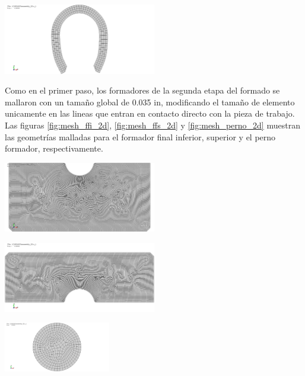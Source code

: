 \begin{center}
\includegraphics[width=0.5\textwidth]{src/ch3/mesh_deformed_blank_2d.png}
\label{fig:mesh_deformed_blank_2d}
\end{center}

Como en el primer paso, los formadores de la segunda etapa del formado se mallaron con un tamaño global de 0.035 in, 
modificando el tamaño de elemento unicamente en las lineas que entran en contacto directo con la pieza de trabajo.
Las figuras \ref{fig:mesh_ffi_2d}, \ref{fig:mesh_ffs_2d} y \ref{fig:mesh_perno_2d} muestran las geometrías malladas 
para el formador final inferior, superior y el perno formador, respectivamente.

\begin{center}
\includegraphics[width=0.5\textwidth]{src/ch3/mesh_ffi_2d.png}
\label{fig:mesh_ffi_2d}
\end{center}

\begin{center}
\includegraphics[width=0.5\textwidth]{src/ch3/mesh_ffs_2d.png}
\label{fig:mesh_ffs_2d}
\end{center}

\begin{center}
\includegraphics[width=0.35\textwidth]{src/ch3/mesh_perno_2d.png}
\label{fig:mesh_perno_2d}
\end{center}



